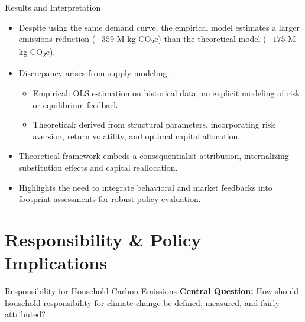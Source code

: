 \documentclass{beamer}
\begin{document}
\begin{frame}{Results and Interpretation}
\footnotesize
\vspace{-2.0em}

\begin{itemize}
    \item Despite using the same demand curve, the empirical model estimates a larger emissions reduction (\(-359\) M kg CO\textsubscript{2}e) than the theoretical model (\(-175\) M kg CO\textsubscript{2}e).
    \item Discrepancy arises from supply modeling:  
        \begin{itemize}
          \footnotesize
            \item Empirical: OLS estimation on historical data; no explicit modeling of risk or equilibrium feedback.  
            \item Theoretical: derived from structural parameters, incorporating risk aversion, return volatility, and optimal capital allocation.
        \end{itemize}
    \item Theoretical framework embeds a consequentialist attribution, internalizing substitution effects and capital reallocation.
    \item Highlights the need to integrate behavioral and market feedbacks into footprint assessments for robust policy evaluation.
\end{itemize}

\end{frame}


\section{Responsibility \& Policy Implications}
\begin{frame}{Responsibility for Household Carbon Emissions}
\footnotesize
\vspace{-2.5em}
\textbf{Central Question:}  
How should household responsibility for climate change be defined, measured, and fairly attributed?\\
  \end{frame}
\end{document}
